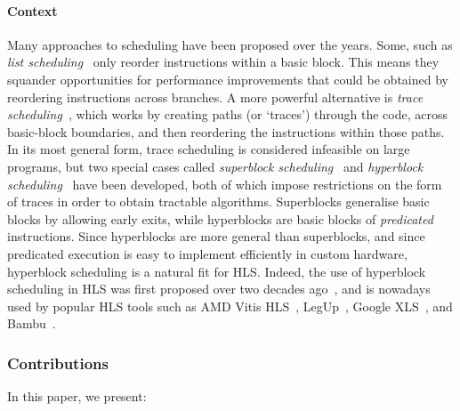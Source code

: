 \paragraph{Context}
Many approaches to scheduling have been proposed over the years. Some, such as
\emph{list scheduling}~\cite[][p.257]{baker19_princ} only reorder instructions
within a basic block. This means they squander opportunities for performance
improvements that could be obtained by reordering instructions across
branches. A more powerful alternative is \emph{trace
  scheduling}~\cite{ellis85_bulld, fisher81_trace_sched}, which works by
creating paths (or `traces') through the code, across basic-block boundaries,
and then reordering the instructions within those paths. In its most general
form, trace scheduling is considered infeasible on large programs, but two
special cases called \emph{superblock scheduling}~\cite{hwu93_super} and
\emph{hyperblock
  scheduling}~\cite{mahlke92_effec_compil_suppor_predic_execut_using_hyper} have
been developed, both of which impose restrictions on the form of traces in order
to obtain tractable algorithms. Superblocks generalise basic blocks by allowing
early exits, while hyperblocks are basic blocks of \emph{predicated}
instructions. Since hyperblocks are more general than superblocks, and since
predicated execution is easy to implement efficiently in custom hardware,
hyperblock scheduling is a natural fit for HLS. Indeed, the use of hyperblock
scheduling in HLS was first proposed over two decades
ago~\cite{budiu02_compil_applic_specif_hardw,
  callahan98_instr_level_paral_recon_comput}, and is nowadays used by popular
HLS tools such as AMD Vitis HLS~\cite{amd23_vitis_forum},
LegUp~\cite[][p.60]{canis15_legup}, Google XLS~\cite[line~112]{google23_xls},
and Bambu~\cite[line~304]{ferrandi14_panda_bambu}.


\subsubsection*{Contributions}

In this paper, we present:

